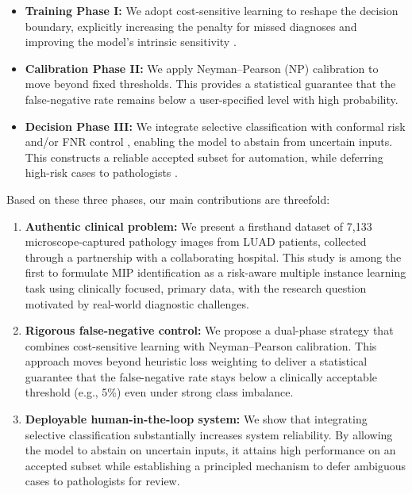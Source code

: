 \documentclass[journal,twoside,web]{ieeecolor}
\begin{document}
\begin{itemize}
\item \textbf{Training Phase I:} We adopt cost-sensitive learning to reshape the decision boundary, explicitly increasing the penalty for missed diagnoses and improving the model’s intrinsic sensitivity \cite{he2009learning}.
\item \textbf{Calibration Phase II:} We apply Neyman–Pearson (NP) calibration \cite{rigollet2011neyman,tong2018neyman} to move beyond fixed thresholds. This provides a statistical guarantee that the false-negative rate remains below a user-specified level with high probability.
\item \textbf{Decision Phase III:} We integrate selective classification with conformal risk and/or FNR control \cite{angelopoulos2022conformal}, enabling the model to abstain from uncertain inputs. This constructs a reliable accepted subset for automation, while deferring high-risk cases to pathologists \cite{geifman2019selectivenet,geifman2017selective}.
\end{itemize}

Based on these three phases, our main contributions are threefold:
\begin{enumerate}
\item \textbf{Authentic clinical problem:} We present a firsthand dataset of 7,133 microscope-captured pathology images from LUAD patients, collected through a partnership with a collaborating hospital. This study is among the first to formulate MIP identification as a risk-aware multiple instance learning task using clinically focused, primary data, with the research question motivated by real-world diagnostic challenges.
\item \textbf{Rigorous false-negative control:} We propose a dual-phase strategy that combines cost-sensitive learning with Neyman–Pearson calibration. This approach moves beyond heuristic loss weighting to deliver a statistical guarantee that the false-negative rate stays below a clinically acceptable threshold (e.g., 5\%) even under strong class imbalance.
\item \textbf{Deployable human-in-the-loop system:} We show that integrating selective classification substantially increases system reliability. By allowing the model to abstain on uncertain inputs, it attains high performance on an accepted subset while establishing a principled mechanism to defer ambiguous cases to pathologists for review.
\end{enumerate}
\end{document}
